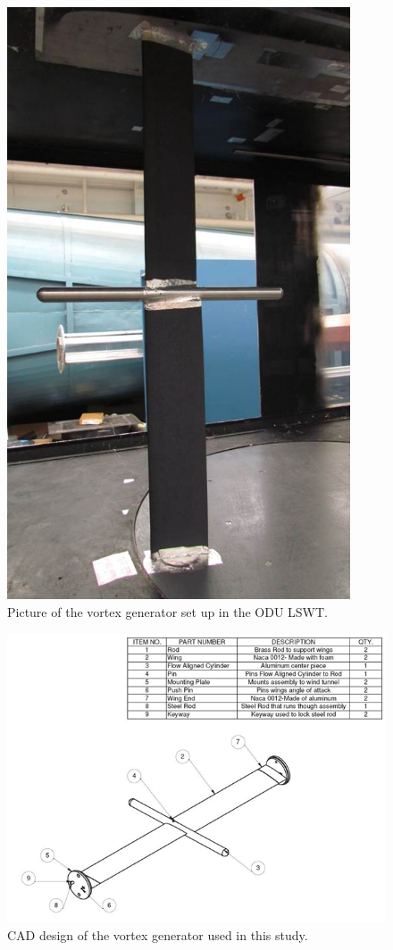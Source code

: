 \vspace{32pt}
\begin{figure}[H]
\centering
\includegraphics[width=4in]{figs/setup/vortex_generator/picture}
\caption{Picture of the vortex generator set up in the ODU LSWT.}
\label{fig:vortex_gen}
\end{figure}

\begin{figure}[H]
\centering
\includegraphics[width=5.75in]{figs/setup/vortex_generator/design}
\caption{CAD design of the vortex generator used in this study.}
\label{fig:vortex_design}
\end{figure}

